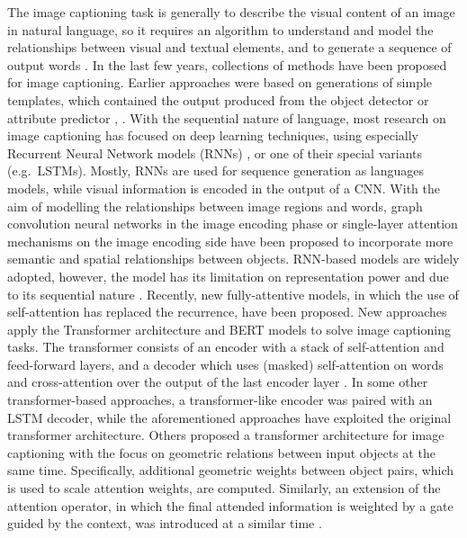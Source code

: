 \documentclass[
]{krantz}
\begin{document}
The image captioning task is generally to describe the visual content of an image in natural language, so it requires an algorithm to understand and model the relationships between visual and textual elements, and to generate a sequence of output words \citep{cornia2020m2}.
In the last few years, collections of methods have been proposed for image captioning. Earlier approaches were based on generations of simple templates, which contained the output produced from the object detector or attribute predictor \citep{Socher10connectingmodalities}, \citep{5487377}.
With the sequential nature of language, most research on image captioning has focused on deep learning techniques, using especially Recurrent Neural Network models (RNNs) \citep{vinyals}, \citep{karpthy1} or one of their special variants (e.g.~LSTMs). Mostly, RNNs are used for sequence generation as languages models, while visual information is encoded in the output of a CNN. With the aim of modelling the relationships between image regions and words, graph convolution neural networks in the image encoding phase \citep{yao1} or single-layer attention mechanisms \citep{xu1} on the image encoding side have been proposed to incorporate more semantic and spatial relationships between objects.
RNN-based models are widely adopted, however, the model has its limitation on representation power and due to its sequential nature \citep{cornia2020m2}.
Recently, new fully-attentive models, in which the use of self-attention has replaced the recurrence, have been proposed. New approaches apply the Transformer architecture \citep{NIPS2017_3f5ee243} and BERT \citep{devlin-etal-2019-bert} models to solve image captioning tasks.
The transformer consists of an encoder with a stack of self-attention and feed-forward layers, and a decoder which uses (masked) self-attention on words and cross-attention over the output of the last encoder layer \citep{cornia2020m2}. In some other transformer-based approaches, a transformer-like encoder was paired with an LSTM decoder, while the aforementioned approaches have exploited the original transformer architecture.
Others \citep{HerdadeKBS19} proposed a transformer architecture for image captioning with the focus on geometric relations between input objects at the same time. Specifically, additional geometric weights between object pairs, which is used to scale attention weights, are computed. Similarly, an extension of the attention operator, in which the final attended information is weighted by a gate guided by the context, was introduced at a similar time \citep{huang1}.
\end{document}
